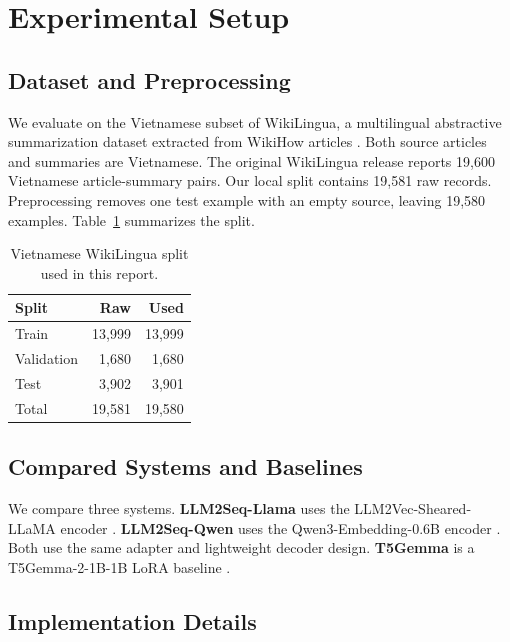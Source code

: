 \documentclass[11pt]{article}
\begin{document}
\section{Experimental Setup}
\label{sec:setup}
\suppressfloats[t]

\subsection{Dataset and Preprocessing}

We evaluate on the Vietnamese subset of WikiLingua, a multilingual abstractive summarization dataset extracted from WikiHow articles \citep{ladhak2020wikilingua}.
Both source articles and summaries are Vietnamese.
The original WikiLingua release reports 19,600 Vietnamese article-summary pairs.
Our local split contains 19,581 raw records.
Preprocessing removes one test example with an empty source, leaving 19,580 examples.
Table~\ref{tab:data-split} summarizes the split.

\begin{table}[htbp]
\centering
\small
\begin{tabular}{lrr}
\toprule
Split & Raw & Used \\
\midrule
Train & 13,999 & 13,999 \\
Validation & 1,680 & 1,680 \\
Test & 3,902 & 3,901 \\
\midrule
Total & 19,581 & 19,580 \\
\bottomrule
\end{tabular}
\caption{Vietnamese WikiLingua split used in this report.}
\label{tab:data-split}
\end{table}

\subsection{Compared Systems and Baselines}

We compare three systems.
\textbf{LLM2Seq-Llama} uses the LLM2Vec-Sheared-LLaMA encoder \citep{behnamghader2024llm2vec}.
\textbf{LLM2Seq-Qwen} uses the Qwen3-Embedding-0.6B encoder \citep{zhang2025qwen3embedding}.
Both use the same adapter and lightweight decoder design.
\textbf{T5Gemma} is a T5Gemma-2-1B-1B LoRA baseline \citep{zhang2025t5gemma2,hu2022lora}.

\subsection{Implementation Details}
\end{document}
